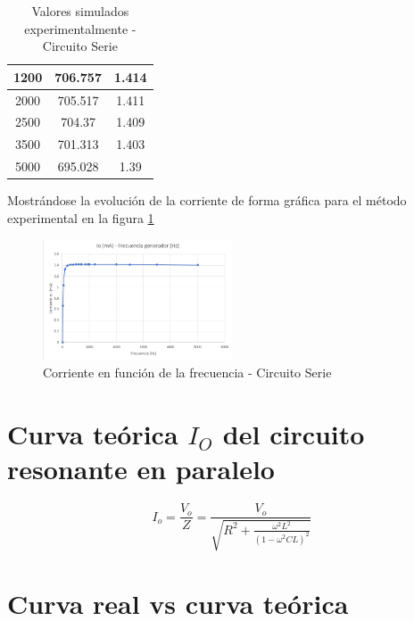 \documentclass[conference]{IEEEtran}
\begin{document}
\begin{table}[h]
\begin{tabular}{|ccc|}
			\multicolumn{1}{|c|}{1200}            & \multicolumn{1}{c|}{706.757}              & 1.414                \\ \hline
			\multicolumn{1}{|c|}{2000}            & \multicolumn{1}{c|}{705.517}              & 1.411                \\ \hline
			\multicolumn{1}{|c|}{2500}            & \multicolumn{1}{c|}{704.37}               & 1.409                \\ \hline
			\multicolumn{1}{|c|}{3500}            & \multicolumn{1}{c|}{701.313}              & 1.403                \\ \hline
			\multicolumn{1}{|c|}{5000}            & \multicolumn{1}{c|}{695.028}              & 1.39                 \\ \hline
		\end{tabular}
		\caption{Valores simulados experimentalmente - Circuito Serie}
		\label{tab:mediciones-serie}
	\end{table}
		
	
	
	
	
	Mostrándose la evolución de la corriente de forma gráfica para el método experimental en la figura \ref{fig:grafica-corriente-serie}
	
	\begin{figure}[h]
		\centering
		\includegraphics[width=0.5\textwidth]{grafica-corriente-serie}
		\caption{Corriente en función de la frecuencia - Circuito Serie}
		\label{fig:grafica-corriente-serie}
	\end{figure}
	

	\section{Curva teórica $I_O$ del circuito resonante en paralelo}
	\begin{equation}
		I_o = \frac{V_o}{Z} = \frac{V_o}{\sqrt{R^2 + \frac{\omega^2 L^2}{(1 - \omega^2 CL)^2}}}
		\label{eq:corriente-paralelo}
	\end{equation}

	
	\section{Curva real vs curva teórica}
	
	
	
	
\end{document}
